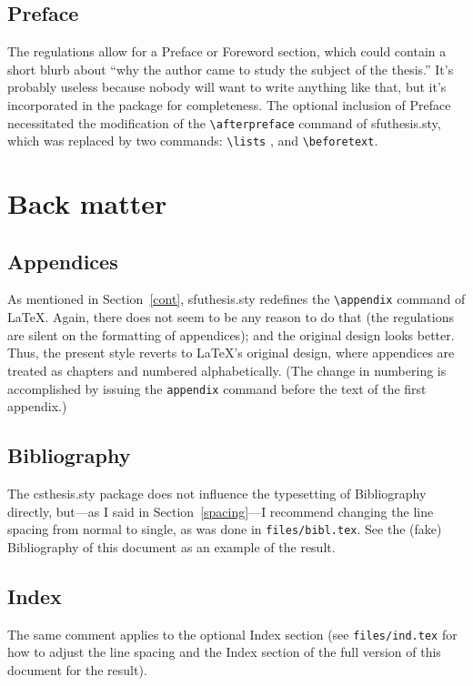 \subsection{Preface} 

The regulations allow for a Preface or
Foreword section, which could contain a short blurb about ``why the
author came to study the subject of the thesis.'' It's probably
useless because nobody will want to write anything like that, but it's
incorporated in the package for completeness. The optional inclusion
of Preface necessitated the modification of the \verb+\afterpreface+%
command of
\textsf{sfuthesis.sty},
which was replaced by two commands: \verb+\lists+%
, and
\verb+\beforetext+.

\section{Back matter}

\subsection{Appendices}

As mentioned in Section~\ref{cont},
\textsf{sfuthesis.sty}
redefines the \verb+\appendix+%
 command of \LaTeX.
Again, there does not seem to be any reason to do that (the
regulations are silent on the formatting of appendices); and the
original design looks better.  Thus, the present style reverts to
\LaTeX's original design, where appendices are treated as chapters and
numbered alphabetically. (The change in numbering is accomplished by
issuing the
\verb+appendix+ command
before the text of the first appendix.)

\subsection{Bibliography}

The \textsf{csthesis.sty}
package does not influence the typesetting of Bibliography directly,
but---as I said in Section~\ref{spacing}---I recommend changing the
line spacing from normal to single, as
was done in \texttt{files/bibl.tex}.
See the (fake) Bibliography of this document as an example of the
result.

\subsection{Index}

The same comment applies to the optional Index section (see
\texttt{files/ind.tex} for how to
adjust the line spacing and the Index section
of the full version of this document for the result).



